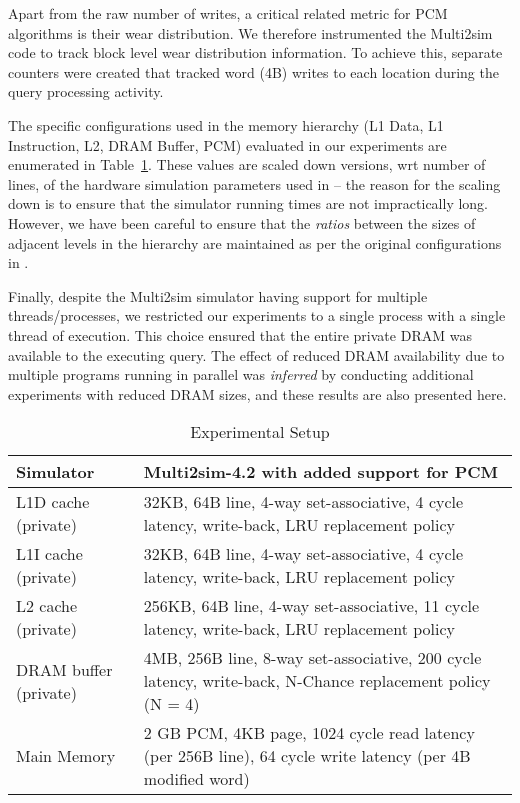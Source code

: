 Apart from the raw number of writes, a critical related metric for PCM
algorithms is their wear distribution. We therefore instrumented the
Multi2sim code to track block level wear distribution information. To
achieve this, separate counters were created that tracked word (4B)
writes to each location during the query processing activity.

The specific configurations used in the memory hierarchy (L1 Data,
L1 Instruction, L2, DRAM Buffer, PCM) evaluated in our experiments are
enumerated in Table~\ref{table:setup}.  These values are scaled down
versions, wrt number of lines, of the hardware simulation parameters
used in \cite{wear} -- the reason for the scaling down is to ensure
that the simulator running times are not impractically long. However,
we have been careful to ensure that the \emph{ratios} between the sizes
of adjacent levels in the hierarchy are maintained as per the original
configurations in \cite{wear}.

Finally, despite the Multi2sim simulator having support for multiple
threads/processes, we restricted our experiments to a single process with
a single thread of execution. This choice ensured that the entire private
DRAM was available to the executing query. The effect of reduced DRAM
availability due to multiple programs running in parallel was \emph{inferred}
by conducting additional experiments with reduced DRAM sizes, and 
these results are also presented here.

\begin{center}
\begin{table}[htbp]
\begin{small}
\caption{Experimental Setup}
\label{table:setup}
\begin{tabular}{p{2.5cm}p{5.2cm}}
\toprule
Simulator & Multi2sim-4.2 with added support for PCM\\ \hline

L1D cache (private) & 32KB, 64B line, 4-way set-associative, 4 cycle latency, write-back, LRU replacement policy\\ \hline
L1I cache (private) & 32KB, 64B line, 4-way set-associative, 4 cycle latency, write-back, LRU replacement policy\\ \hline   
L2 cache (private) & 256KB, 64B line, 4-way set-associative, 11 cycle latency, write-back, LRU replacement policy\\ \hline

DRAM buffer (private) & 4MB, 256B line, 8-way set-associative, 200 cycle latency, write-back, N-Chance replacement policy (N = 4)\\ \hline

Main Memory & 2 GB PCM, 4KB page, 1024 cycle read latency (per 256B line), 64 cycle write latency (per 4B modified word)\\
\bottomrule
\end{tabular}
\end{small}
\end{table}
\end{center}

